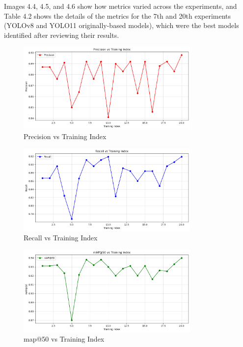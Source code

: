 Images 4.4, 4.5, and 4.6 show how metrics varied across the experiments, and Table 4.2 shows the details of the metrics for the 7th and 20th experiments (YOLOv8 and YOLO11 originally-based models), which were the best models identified after reviewing their results.\\

\begin{figure}[H]
    \centering
    \includegraphics[width=0.8\textwidth]{src/images/ft_precision.png}
    \caption{Precision vs Training Index}
    \label{fig:ft1}
\end{figure}

\begin{figure}[H]
    \centering
    \includegraphics[width=0.8\textwidth]{src/images/ft_recall.png}
    \caption{Recall vs Training Index}
    \label{fig:ft2}
\end{figure}

\begin{figure}[H]
    \centering
    \includegraphics[width=0.8\textwidth]{src/images/ft_map50.png}
    \caption{map@50 vs Training Index}
    \label{fig:ft3}
\end{figure}

